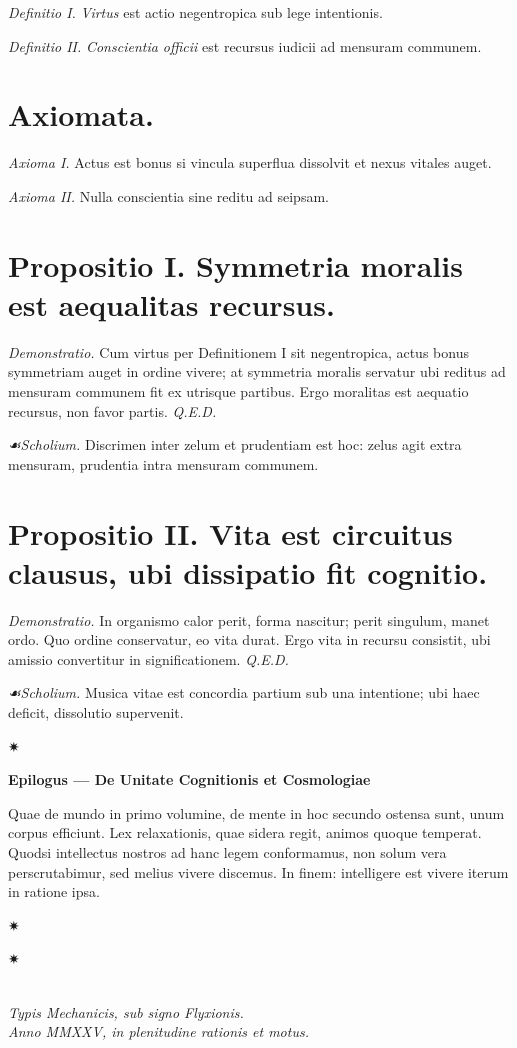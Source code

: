 \documentclass[12pt]{article}
\newcommand{\florale}{\centerline{\large ✷}}
\newcommand{\scholia}{\textit{☙\;}}
\newcommand{\divider}{\vspace{1em}\florale\vspace{1em}}
\begin{document}
\textit{Definitio I.} \; \textit{Virtus} est actio negentropica sub lege intentionis.

\textit{Definitio II.} \; \textit{Conscientia officii} est recursus iudicii ad mensuram communem.

\section*{Axiomata.}

\textit{Axioma I.} \; Actus est bonus si vincula superflua dissolvit et nexus vitales auget.

\textit{Axioma II.} \; Nulla conscientia sine reditu ad seipsam.

\section*{Propositio I. \; Symmetria moralis est aequalitas recursus.}

\textit{Demonstratio.} Cum virtus per Definitionem I sit negentropica, actus bonus symmetriam auget in ordine vivere; at symmetria moralis servatur ubi reditus ad mensuram communem fit ex utrisque partibus. Ergo moralitas est aequatio recursus, non favor partis. \textit{Q.E.D.}

\textit{\scholia Scholium.} Discrimen inter zelum et prudentiam est hoc: zelus agit extra mensuram, prudentia intra mensuram communem.

\section*{Propositio II. \; Vita est circuitus clausus, ubi dissipatio fit cognitio.}

\textit{Demonstratio.} In organismo calor perit, forma nascitur; perit singulum, manet ordo. Quo ordine conservatur, eo vita durat. Ergo vita in recursu consistit, ubi amissio convertitur in significationem. \textit{Q.E.D.}

\textit{\scholia Scholium.} Musica vitae est concordia partium sub una intentione; ubi haec deficit, dissolutio supervenit.

\divider

\begin{center}\textbf{Epilogus — De Unitate Cognitionis et Cosmologiae}\end{center}

Quae de mundo in primo volumine, de mente in hoc secundo ostensa sunt, unum corpus efficiunt. Lex relaxationis, quae sidera regit, animos quoque temperat. Quodsi intellectus nostros ad hanc legem conformamus, non solum vera perscrutabimur, sed melius vivere discemus. In finem: intelligere est vivere iterum in ratione ipsa.

\divider

\begin{center}
\florale\\[0.5em]
\textit{Typis Mechanicis, sub signo Flyxionis.}\\
\textit{Anno MMXXV, in plenitudine rationis et motus.}
\end{center}
\end{document}
